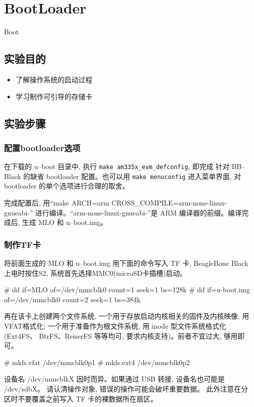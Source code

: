 \chapter{BootLoader}{Boot}

\section{实验目的}
\begin{itemize}
    \item 了解操作系统的启动过程
    \item 学习制作可引导的存储卡
\end{itemize}

\section{实验步骤}
\subsection{配置bootloader选项}
在下载的 u--boot 目录中, 执行 \verb|make am335x_evm_defconfig|, 即完成
针对 BB--Black 的缺省 bootloader 配置。也可以用 \verb|make menuconfig|
进入菜单界面, 对bootloader 的单个选项进行合理的取舍。

完成配置后, 用``make ARCH=arm CROSS\_COMPILE=arm-none-linux-gnueabi-''
进行编译。``arm-none-linux-gnueabi-''是 ARM 编译器的前缀。编译完成后,
生成 MLO 和 u--boot.img。

\subsection{制作TF卡}
将前面生成的 MLO 和 u--boot.img 用下面的命令写入 TF 卡, BeagleBone Black
上电时按住S2, 系统首先选择MMC0(microSD卡插槽)启动。

\begin{blockcode}
# dd if=MLO of=/dev/mmcblk0 count=1 seek=1 bs=128k
# dd if=u-boot.img of=/dev/mmcblk0 count=2 seek=1 bs=384k
\end{blockcode}

再在该卡上创建两个文件系统, 一个用于存放启动内核相关的固件及内核映像, 用
VFAT格式化; 一个用于准备作为根文件系统, 用 inode 型文件系统格式化(Ext4FS、
BtrFS、ReiserFS 等等均可, 要求内核支持)。前者不宜过大, 够用即可。

\begin{blockcode}
# mkfs.vfat /dev/mmcblk0p1
# mkfs.ext4 /dev/mmcblk0p2
\end{blockcode}

设备名 /dev/mmcblkX 因时而异。如果通过 USB 转接, 设备名也可能是 /dev/sdbX。
请认清操作对象, 错误的操作可能会破坏重要数据。
此外注意在分区时不要覆盖之前写入 TF 卡的裸数据所在扇区。

